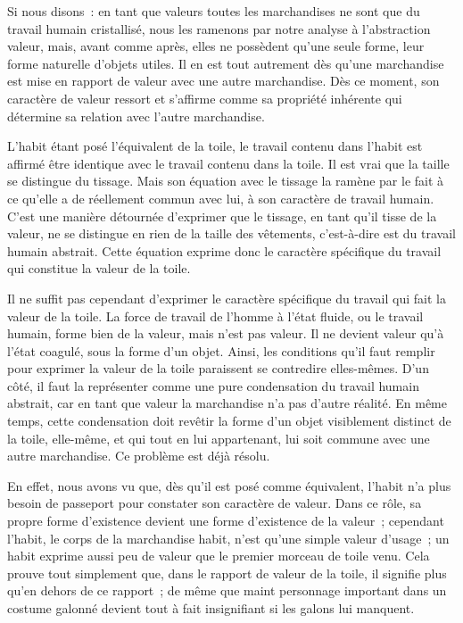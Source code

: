 \documentclass[french,twoside]{book} %
\begin{document}
Si nous disons : en tant que valeurs toutes les marchandises ne sont que du travail humain cristallisé, nous les ramenons par notre analyse à l’abstraction valeur, mais, avant comme après, elles ne possèdent qu’une seule forme, leur forme naturelle d’objets utiles. Il en est tout autrement dès qu’une marchandise est mise en rapport de valeur avec une autre marchandise. Dès ce moment, son caractère de valeur ressort et s’affirme comme sa propriété inhérente qui détermine sa relation avec l’autre marchandise.\par
L’habit étant posé l’équivalent de la toile, le travail contenu dans l’habit est affirmé être identique avec le travail contenu dans la toile. Il est vrai que la taille se distingue du tissage. Mais son équation avec le tissage la ramène par le fait à ce qu’elle a de réellement commun avec lui, à son caractère de travail humain. C’est une manière détournée d’exprimer que le tissage, en tant qu’il tisse de la valeur, ne se distingue en rien de la taille des vêtements, c’est-à-dire est du travail humain abstrait. Cette équation exprime donc le caractère spécifique du travail qui constitue la valeur de la toile.\par
Il ne suffit pas cependant d’exprimer le caractère spécifique du travail qui fait la valeur de la toile. La force de travail de l’homme à l’état fluide, ou le travail humain, forme bien de la valeur, mais n’est pas valeur. Il ne devient valeur qu’à l’état coagulé, sous la forme d’un objet. Ainsi, les conditions qu’il faut remplir pour exprimer la valeur de la toile paraissent se contredire elles-mêmes. D’un côté, il faut la représenter comme une pure condensation du travail humain abstrait, car en tant que valeur la marchandise n’a pas d’autre réalité. En même temps, cette condensation doit revêtir la forme d’un objet visiblement distinct de la toile, elle-même, et qui tout en lui appartenant, lui soit commune avec une autre marchandise. Ce problème est déjà résolu.\par
En effet, nous avons vu que, dès qu’il est posé comme équivalent, l’habit n’a plus besoin de passeport pour constater son caractère de valeur. Dans ce rôle, sa propre forme d’existence devient une forme d’existence de la valeur ; cependant l’habit, le corps de la marchandise habit, n’est qu’une simple valeur d’usage ; un habit exprime aussi peu de valeur que le premier morceau de toile venu. Cela prouve tout simplement que, dans le rapport de valeur de la toile, il signifie plus qu’en dehors de ce rapport ; de même que maint personnage important dans un costume galonné devient tout à fait insignifiant si les galons lui manquent.\par
\end{document}
